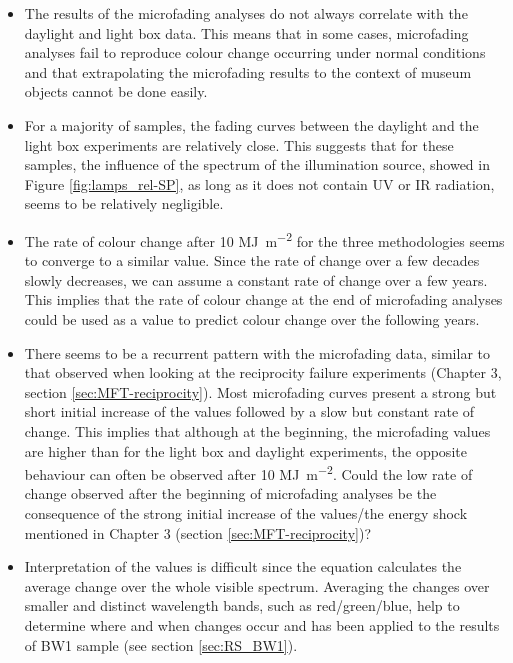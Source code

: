 \begin{itemize}
    \item The results of the microfading analyses do not always correlate with the daylight and light box data. This means that in some cases, microfading analyses fail to reproduce colour change occurring under normal conditions and that extrapolating the microfading results to the context of museum objects cannot be done easily. 
    \item For a majority of samples, the fading curves between the daylight and the light box experiments are relatively close. This suggests that for these samples, the influence of the spectrum of the illumination source, showed in Figure \ref{fig:lamps_rel-SP}, as long as it does not contain \gls{UV} or \gls{IR} radiation, seems to be relatively negligible. 
    \item The rate of colour change after 10 \unit{\mega\joule\per\square\metre} for the three methodologies seems to converge to a similar value. Since the rate of change over a few decades slowly decreases, we can assume a constant rate of change over a few years. This implies that the rate of colour change at the end of microfading analyses could be used as a value to predict colour change over the following years.
    \item There seems to be a recurrent pattern with the microfading data, similar to that observed when looking at the reciprocity failure experiments (Chapter 3, section \ref{sec:MFT-reciprocity}). Most microfading curves present a strong but short initial increase of the \dEOO values followed by a slow but constant rate of change. This implies that although at the beginning, the microfading \dEOO values are higher than for the light box and daylight experiments, the opposite behaviour can often be observed after 10 \unit{\mega\joule\per\square\metre}. Could the low rate of change observed after the beginning of microfading analyses be the consequence of the strong initial increase of the \dEOO values/the energy shock mentioned in Chapter 3 (section \ref{sec:MFT-reciprocity})? 
    \item Interpretation of the \dRvis values is difficult since the equation calculates the average change over the whole visible spectrum. Averaging the changes over smaller and distinct wavelength bands, such as red/green/blue, help to determine where and when changes occur and has been applied to the results of BW1 sample (see section \ref{sec:RS_BW1}).    
\end{itemize}  
  
